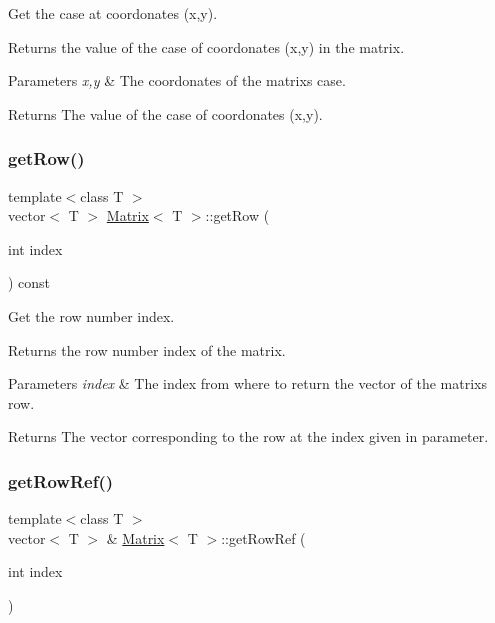 Get the case at coordonates (x,y). 

Returns the value of the case of coordonates (x,y) in the matrix.


\begin{DoxyParams}{Parameters}
{\em x,y} & The coordonates of the matrix\textquotesingle{}s case. \\
\hline
\end{DoxyParams}
\begin{DoxyReturn}{Returns}
The value of the case of coordonates (x,y). 
\end{DoxyReturn}
\mbox{\label{class_matrix_ac7ba1c9a4c54c456542906d7c7aaba58}} 
\subsubsection{\texorpdfstring{get\+Row()}{getRow()}}
{\footnotesize\ttfamily template$<$class T $>$ \\
vector$<$ T $>$ \mbox{\hyperlink{class_matrix}{Matrix}}$<$ T $>$\+::get\+Row (\begin{DoxyParamCaption}\item[{int}]{index }\end{DoxyParamCaption}) const}



Get the row number index. 

Returns the row number index of the matrix.


\begin{DoxyParams}{Parameters}
{\em index} & The index from where to return the vector of the matrix\textquotesingle{}s row. \\
\hline
\end{DoxyParams}
\begin{DoxyReturn}{Returns}
The vector corresponding to the row at the index given in parameter. 
\end{DoxyReturn}
\mbox{\label{class_matrix_ae94e4cab3fb53678a7994f605f606595}} 
\subsubsection{\texorpdfstring{get\+Row\+Ref()}{getRowRef()}}
{\footnotesize\ttfamily template$<$class T $>$ \\
vector$<$ T $>$ \& \mbox{\hyperlink{class_matrix}{Matrix}}$<$ T $>$\+::get\+Row\+Ref (\begin{DoxyParamCaption}\item[{int}]{index }\end{DoxyParamCaption})}



